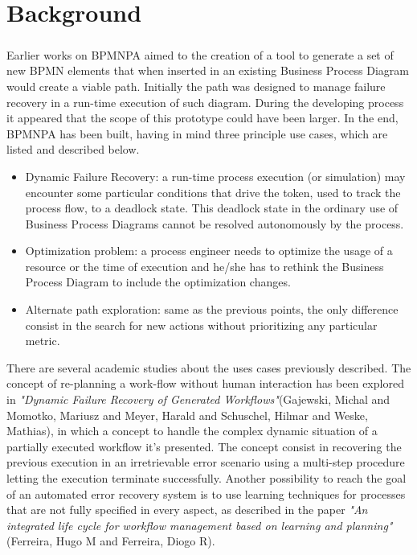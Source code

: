 \chapter{Background}
\label{cha:789}
\paragraph{}
Earlier works on BPMNPA aimed to the creation of a tool to generate a set of new BPMN elements that when inserted in an existing Business Process Diagram would create a viable path. Initially the path was designed to manage failure recovery in a run-time execution of such diagram. During the developing process it appeared that the scope of this prototype could have been larger. In the end, BPMNPA has been built, having in mind three principle use cases, which are listed and described below.

\begin{itemize}  
\item Dynamic Failure Recovery: a run-time process execution (or simulation) may encounter some particular conditions that drive the token, used to track the process flow, to a deadlock state. This deadlock state in the ordinary use of Business Process Diagrams cannot be resolved autonomously by the process.

\item Optimization problem: a process engineer needs to optimize the usage of a resource or the time of execution and he/she has to rethink the Business Process Diagram to include the optimization changes.

\item Alternate path exploration: same as the previous points, the only difference consist in the search for new actions without prioritizing any particular metric.
\end{itemize}


There are several academic studies about the uses cases previously described.
The concept of re-planning a work-flow without human interaction has been explored in \textit{"Dynamic Failure Recovery of Generated Workflows"}(Gajewski, Michal and Momotko, Mariusz and Meyer, Harald and Schuschel,
Hilmar and Weske, Mathias), in which a concept to handle the complex dynamic situation of a partially executed workflow it's presented. The concept consist in recovering the previous execution in an irretrievable error scenario using a multi-step procedure letting the execution terminate successfully.\cite{gajewski2005dynamic}
Another possibility to reach the goal of an automated error recovery system is to use learning techniques for processes that are not fully specified in every aspect, as described in the paper \textit{"An integrated life cycle for workflow management based on learning and planning"}(Ferreira, Hugo M and Ferreira,
Diogo R)\cite{ferreira2006integrated}.

